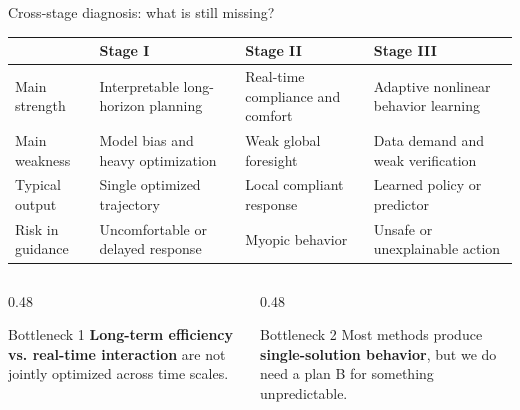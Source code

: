 \documentclass[aspectratio=169]{beamer}
\begin{document}
\begin{frame}{Cross-stage diagnosis: what is still missing?}
\scriptsize
\begin{tabularx}{\textwidth}{>{\raggedright\arraybackslash}p{2.2cm}XXX}
\toprule
 & \textbf{Stage I} & \textbf{Stage II} & \textbf{Stage III} \\
\midrule
Main strength & Interpretable long-horizon planning & Real-time compliance and comfort & Adaptive nonlinear behavior learning \\
Main weakness & Model bias and heavy optimization & Weak global foresight & Data demand and weak verification \\
Typical output & Single optimized trajectory & Local compliant response & Learned policy or predictor \\
Risk in guidance & Uncomfortable or delayed response & Myopic behavior & Unsafe or unexplainable action \\
\bottomrule
\end{tabularx}
\vspace{0.6em}
\begin{columns}[T,onlytextwidth]
    \begin{column}{0.48\textwidth}
        \begin{block}{Bottleneck 1}
        \textbf{Long-term efficiency vs. real-time interaction} are not jointly optimized across time scales.
        \end{block}
    \end{column}
    \begin{column}{0.48\textwidth}
        \begin{block}{Bottleneck 2}
        Most methods produce \textbf{single-solution behavior}, but we do need a plan B for something unpredictable.
        \end{block}
    \end{column}
\end{columns}
\end{frame}
\end{document}

